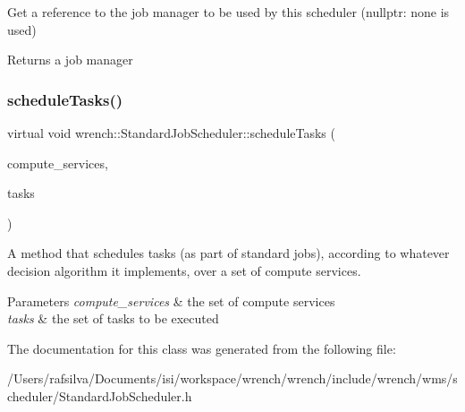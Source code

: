 Get a reference to the job manager to be used by this scheduler (nullptr\+: none is used) 

\begin{DoxyReturn}{Returns}
a job manager 
\end{DoxyReturn}
\mbox{\label{classwrench_1_1_standard_job_scheduler_a1ef07acfece4706f7f172c740a8015c3}} 
\subsubsection{\texorpdfstring{schedule\+Tasks()}{scheduleTasks()}}
{\footnotesize\ttfamily virtual void wrench\+::\+Standard\+Job\+Scheduler\+::schedule\+Tasks (\begin{DoxyParamCaption}\item[{const std\+::set$<$ \hyperlink{classwrench_1_1_compute_service}{Compute\+Service} $\ast$$>$ \&}]{compute\+\_\+services,  }\item[{const std\+::vector$<$ \hyperlink{classwrench_1_1_workflow_task}{Workflow\+Task} $\ast$$>$ \&}]{tasks }\end{DoxyParamCaption})\hspace{0.3cm}{\ttfamily [pure virtual]}}



A method that schedules tasks (as part of standard jobs), according to whatever decision algorithm it implements, over a set of compute services. 


\begin{DoxyParams}{Parameters}
{\em compute\+\_\+services} & the set of compute services \\
\hline
{\em tasks} & the set of tasks to be executed \\
\hline
\end{DoxyParams}


The documentation for this class was generated from the following file\+:\begin{DoxyCompactItemize}
\item 
/\+Users/rafsilva/\+Documents/isi/workspace/wrench/wrench/include/wrench/wms/scheduler/Standard\+Job\+Scheduler.\+h\end{DoxyCompactItemize}
